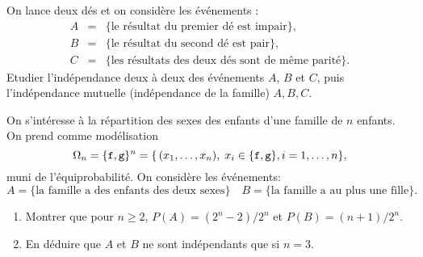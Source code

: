 \documentclass[a4paper,12pt,reqno]{amsart}
\begin{document}
\begin{exo}

  On lance deux dés et on considère les événements :
  \begin{eqnarray*}
    A & = & \{\text{le résultat du premier dé est impair}\},\\
    B & = & \{\text{le résultat du second dé est pair}\},\\
    C & = & \{\text{les résultats des deux dés sont de même parité}\}.
  \end{eqnarray*}
  Etudier l'indépendance deux à deux des événements $A$, $B$ et $C$,
  puis l'indépendance mutuelle (indépendance de la famille) $A,B,C$.

\end{exo}

\begin{exo}

  On s'intéresse à la répartition des sexes des enfants d'une famille de
  $n$ enfants. On prend comme modélisation
    $$
      \Omega_n=\{{\tt f},{\tt g}\}^n=\{\,(x_1,\ldots,x_n),\; x_i\in\{{\tt f},{\tt g}\}, i=1,\dots,n\},
    $$
  muni de l'équiprobabilité. On considère les événements:
    $$
      A=\{\text{la famille a des enfants des deux sexes}\}\quad
      B=\{\text{la famille a au plus une fille}\}.
    $$

  \begin{enumerate}
    \item  Montrer que pour $n\geq 2$, $P(A)=(2^n-2)/2^n$ et $P(B)=(n+1)/2^n$.
    \item  En déduire que $A$ et $B$ ne sont indépendants que si $n=3$.
  \end{enumerate}

 \end{exo}
\end{document}
